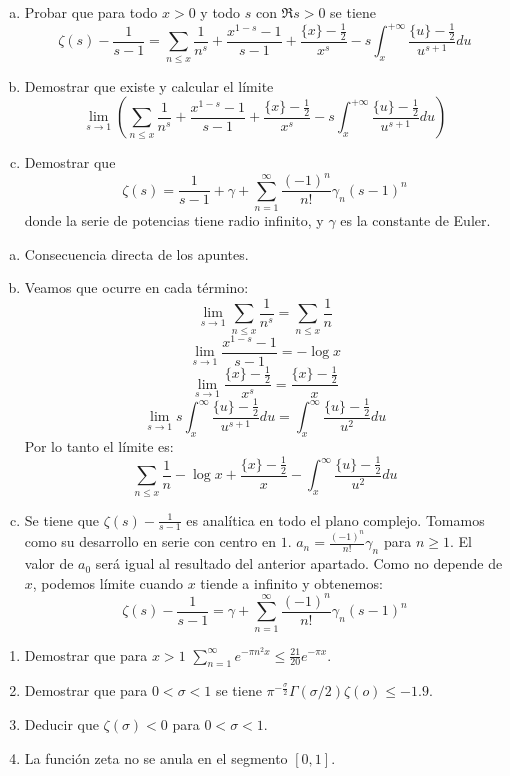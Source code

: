 \documentclass[twoside]{article}
\begin{document}
\newpage
\begin{ejercicio}{2}
\begin{enumerate}[(a)]
	\item Probar que para todo $x > 0$ y todo $s$ con $\Re s > 0$ se tiene
	\[ ζ(s) - \frac{1}{s-1} = \sum_{n≤x} \frac{1}{n^s} + \frac{x^{1-s}-1}{s-1} + \frac{\{x\}-\frac{1}{2}}{x^s} - s \int_x^{+∞} \frac{\{u\}-\frac{1}{2}}{u^{s+1}} du \]
	\item Demostrar que existe y calcular el límite
	\[ \lim_{s \to 1} \left(\sum_{n≤x} \frac{1}{n^s} + \frac{x^{1-s}-1}{s-1} + \frac{\{x\}-\frac{1}{2}}{x^s} - s \int_x^{+∞} \frac{\{u\}-\frac{1}{2}}{u^{s+1}} du\right) \]
	\item Demostrar que
	\[ ζ(s) = \frac{1}{s-1} + γ + \sum_{n=1}^{∞} \frac{(-1)^n}{n!} γ_n (s-1)^n \]
	donde la serie de potencias tiene radio infinito, y $γ$ es la constante de Euler.
\end{enumerate}
\end{ejercicio}
\begin{solucion}
\begin{enumerate}[(a)]
	\item Consecuencia directa de los apuntes.
	\item Veamos que ocurre en cada término:
	\[ \lim_{s \to 1} \sum_{n≤x} \frac{1}{n^s} = \sum_{n≤x} \frac{1}{n} \]
	\[ \lim_{s \to 1} \frac{x^{1-s}-1}{s-1} = - \log x \]
	\[ \lim_{s \to 1} \frac{\{x\}-\frac{1}{2}}{x^s} = \frac{\{x\}-\frac{1}{2}}{x} \]
	\[ \lim_{s \to 1} s \int_x^{∞} \frac{\{u\}-\frac{1}{2}}{u^{s+1}} du = \int_x^{∞} \frac{\{u\}-\frac{1}{2}}{u^2} du \]
	Por lo tanto el límite es:
	\[ \sum_{n≤x}\frac{1}{n} - \log x + \frac{\{x\}-\frac{1}{2}}{x} - \int_x^{∞} \frac{\{u\}-\frac{1}{2}}{u^2} du \]
	\item Se tiene que $ζ(s)-\frac{1}{s-1}$ es analítica en todo el plano complejo. Tomamos como su desarrollo en serie con centro en $1$. $a_n=\frac{(-1)^n}{n!} γ_n$ para $n ≥ 1$. El valor de $a_0$ será igual al resultado del anterior apartado. Como no depende de $x$, podemos límite cuando $x$ tiende a infinito y obtenemos:
	\[ ζ(s) - \frac{1}{s-1} = γ + \sum_{n=1}^{∞} \frac{(-1)^n}{n!} γ_n (s-1)^n \]
\end{enumerate}
\end{solucion}
\newpage

\begin{ejercicio}{3}
\begin{enumerate}
	\item Demostrar que para $x > 1$ $\sum_{n=1}^{∞} e^{-πn^2 x} ≤ \frac{21}{20} e^{-πx}$.
	\item Demostrar que para $0 < σ < 1$ se tiene $π^{-\frac{σ}{2}}Γ(σ/2) ζ(ο) ≤ -1.9$.
	\item Deducir que $ζ(σ) < 0$ para $0 < σ < 1$.
	\item La función zeta no se anula en el segmento $[0,1]$.
\end{enumerate}
\end{ejercicio}
\begin{solucion}
\end{solucion}
\newpage
\end{document}
